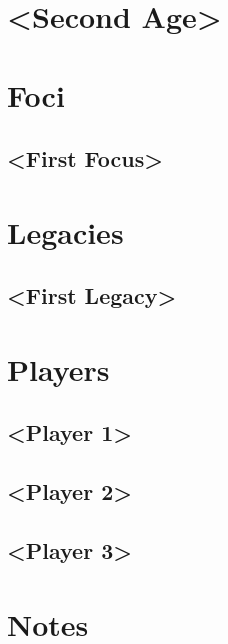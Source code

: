 \documentclass[letterpaper,twoside,openany]{book}
\newcommand{\dark}{\textbullet}
\begin{document}
	\chapter{ <Second Age> \dark }

	\appendix

	\chapter{Foci}
	\section{<First Focus>}

	\chapter{Legacies}
	\section{<First Legacy>}

	\chapter{Players}
	\section{<Player 1>}
	\section{<Player 2>}
	\section{<Player 3>}

	\chapter{Notes}
\end{document}
